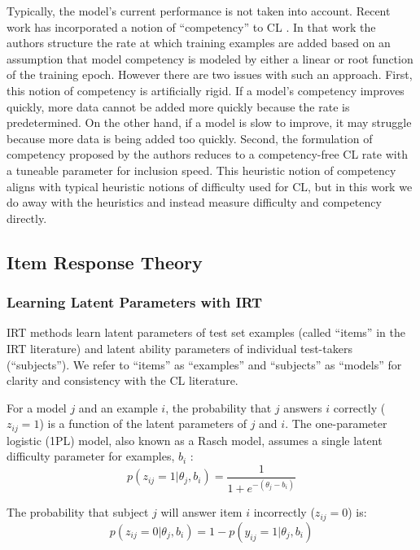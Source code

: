 \documentclass[letterpaper]{article} %
\begin{document}
Typically, the model's current performance is not taken into account. 
Recent work has incorporated a notion of ``competency'' to CL \cite{platanios_competence-based_2019}.
In that work the authors structure the rate at which training examples are added based on an assumption that model competency is modeled by either a linear or root function of the training epoch.
However there are two issues with such an approach.
First, this notion of competency is artificially rigid.
If a model's competency improves quickly, more data cannot be added more quickly because the rate is predetermined.
On the other hand, if a model is slow to improve, it may struggle because more data is being added too quickly.
Second, the formulation of competency proposed by the authors reduces to a competency-free CL rate with a tuneable parameter for inclusion speed.
This heuristic notion of competency aligns with typical heuristic notions of difficulty used for CL, but in this work we do away with the heuristics and instead measure difficulty and competency directly. 

\subsection{Item Response Theory}
\label{ssec:irt} 
\subsubsection{Learning Latent Parameters with IRT}
IRT methods learn latent parameters of test set examples (called ``items'' in the IRT literature) and latent ability parameters of individual test-takers (``subjects'').
We refer to ``items'' as ``examples'' and ``subjects'' as ``models'' for clarity and consistency with the CL literature.

For a model $j$ and an example $i$, the probability that $j$ answers $i$ correctly ($z_{ij}=1$) is a function of the latent parameters of $j$ and $i$.
The one-parameter logistic (1PL) model, also known as a Rasch model, assumes a single latent difficulty parameter for examples, $b_i$ \cite{rasch_studies_1960,baker_item_2004}:
\begin{equation} 
p(z_{ij} = 1 \vert \theta_j, b_i) = \frac{1}{1 + e^{-(\theta_j - b_i)}}
\end{equation}

The probability that subject $j$ will answer item $i$ incorrectly ($z_{ij}=0$) is:
\begin{equation} 
p(z_{ij} = 0 | \theta_j, b_i) = 1 - p(y_{ij} = 1 \vert \theta_j, b_i)
\end{equation} 
\end{document}
